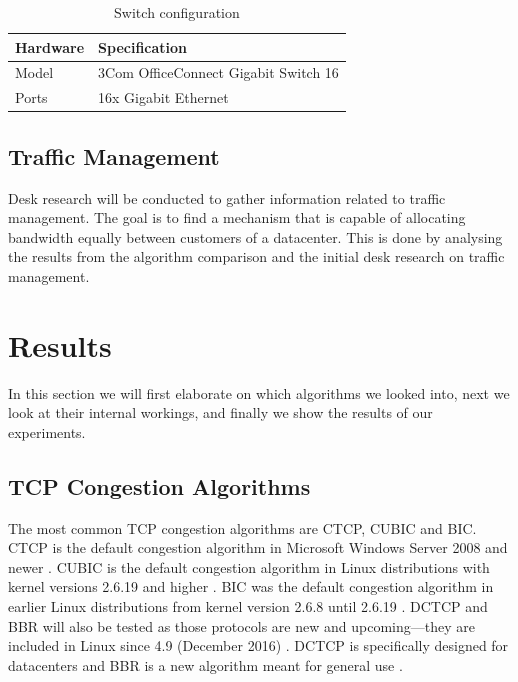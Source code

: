 \documentclass{article}
\begin{document}
\begin{table}[H]
	\centering
	\caption{Switch configuration}
	\begin{tabular}[H]{ | l | l | }
	\hline
	\textbf{Hardware} & \textbf{Specification} \\
	\hline  Model & 3Com OfficeConnect Gigabit Switch 16\\
	\hline  Ports & 16x Gigabit Ethernet\\
	\hline
	\end{tabular}
	\label{table:spec2}
\end{table}

\subsection{Traffic Management}

Desk research will be conducted to gather information related to traffic management. The goal is to find a mechanism that is capable of allocating bandwidth equally between customers of a datacenter. This is done by analysing the results from the algorithm comparison and the initial desk research on traffic management.


\section{Results}\label{sec:results}

In this section we will first elaborate on which algorithms we looked into, next we look at their internal workings, and finally we show the results of our experiments.


\subsection{TCP Congestion Algorithms}\label{sub:chosen-algos}

The most common TCP congestion algorithms are CTCP, CUBIC and BIC. CTCP is the default congestion algorithm in Microsoft Windows Server 2008 and newer \cite{cubic-kernel-version}. CUBIC is the default congestion algorithm in Linux distributions with kernel versions 2.6.19 and higher \cite{cubic-kernel-version}. BIC was the default congestion algorithm in earlier Linux distributions from kernel version 2.6.8 until 2.6.19 \cite{bic-kernel-version} \cite{cubic-kernel-version}. DCTCP and BBR will also be tested as those protocols are new and upcoming---they are included in Linux since 4.9 (December 2016) \cite{linux-bbr}. DCTCP is specifically designed for datacenters \cite{dctcp-congestion} and BBR is a new algorithm meant for general use \cite{bbr-congestion}.
\end{document}
